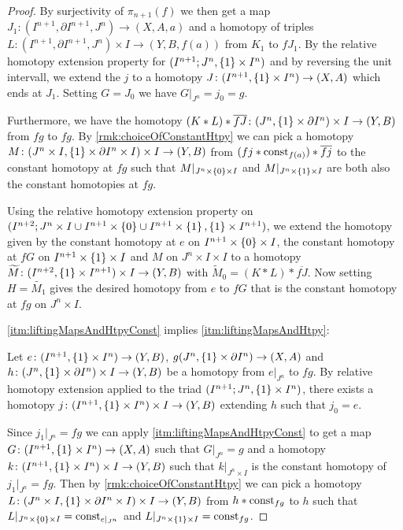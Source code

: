 \begin{prop}
\begin{proof}
        By surjectivity of $\pi_{n+1}(f)$ we then get a map $J_1\colon(I^{n+1},\partial I^{n+1},J^n)\to(X,A,a)$ and a homotopy of triples $L\colon(I^{n+1},\partial I^{n+1},J^n)\times I\to(Y,B,f(a))$ from $K_1$ to $fJ_1$.
        By the relative homotopy extension property for $(I^{n+1};J^n,\left\lbrace1\right\rbrace\times I^n)$ and by reversing the unit intervall, we extend the $j$ to a homotopy $J\colon(I^{n+1},\left\lbrace1\right\rbrace\times I^n)\to(X,A)$ which ends at $J_1$.
        Setting $G=J_0$ we have $G|_{J^n}=j_0=g$.

        Furthermore, we have the homotopy $(K*L)*\overline{fJ}\colon(J^n,\left\lbrace1\right\rbrace\times\partial I^n)\times I\to(Y,B)$ from $fg$ to $fg$.
        By \cref{rmk:choiceOfConstantHtpy} we can pick a homotopy $M\colon(J^n\times I,\left\lbrace1\right\rbrace\times\partial I^n\times I)\times I\to(Y,B)$ from $(fj*\operatorname{const}_{f(a)})*\overline{fj}$ to the constant homotopy at $fg$ such that $M|_{J^n\times\left\lbrace0\right\rbrace\times I}$ and $M|_{J^n\times\left\lbrace1\right\rbrace\times I}$ are both also the constant homotopies at $fg$.
        
        Using the relative homotopy extension property on $(I^{n+2};J^n\times I\cup I^{n+1}\times\left\lbrace0\right\rbrace\cup I^{n+1}\times\left\lbrace1\right\rbrace,\left\lbrace1\right\rbrace\times I^{n+1})$, we extend the homotopy given by the constant homotopy at $e$ on $I^{n+1}\times\left\lbrace0\right\rbrace\times I$, the constant homotopy at $fG$ on $I^{n+1}\times\left\lbrace1\right\rbrace\times I$ and $M$ on $J^n\times I\times I$ to a homotopy $\widetilde{M}\colon(I^{n+2},\left\lbrace1\right\rbrace\times I^{n+1})\times I\to(Y,B)$ with $\widetilde{M}_0=(K*L)*\overline{fJ}$.
        Now setting $H=\widetilde{M_1}$ gives the desired homotopy from $e$ to $fG$ that is the constant homotopy at $fg$ on $J^n\times I$.
        
        \ref{itm:liftingMapsAndHtpyConst} implies \ref{itm:liftingMapsAndHtpy}:

        Let $e\colon(I^{n+1},\left\lbrace1\right\rbrace\times I^n)\to (Y,B)$, $g(J^n,\left\lbrace1\right\rbrace\times\partial I^n)\to(X,A)$ and $h\colon(J^n,\left\lbrace1\right\rbrace\times\partial I^n)\times I\to(Y,B)$ be a homotopy from $e|_{J^n}$ to $fg$.
        By relative homotopy extension applied to the triad $(I^{n+1};J^n,\left\lbrace1\right\rbrace\times I^n)$, there exists a homotopy $j\colon(I^{n+1},\left\lbrace1\right\rbrace\times I^n)\times I\to(Y,B)$ extending $h$ such that $j_0=e$.
        
        Since $j_1|_{J^n}=fg$ we can apply \ref{itm:liftingMapsAndHtpyConst} to get a map $G\colon(I^{n+1},\left\lbrace1\right\rbrace\times I^n)\to(X,A)$ such that $G|_{J^n}=g$ and a homotopy $k\colon(I^{n+1},\left\lbrace1\right\rbrace\times I^n)\times I\to(Y,B)$ such that $k|_{J^n\times I}$ is the constant homotopy of $j_1|_{J^n}=fg$. 
        Then by \cref{rmk:choiceOfConstantHtpy} we can pick a homotopy $L\colon(J^n\times I,\left\lbrace1\right\rbrace\times\partial I^n\times I)\times I\to (Y,B)$ from $h*\operatorname{const}_{fg}$ to $h$ such that $L|_{J^n\times\left\lbrace0\right\rbrace\times I}=\operatorname{const}_{e|_{J^n}}$ and $L|_{J^n\times\left\lbrace1\right\rbrace\times I}=\operatorname{const}_{fg}$.
        

\end{proof}
\end{prop}
